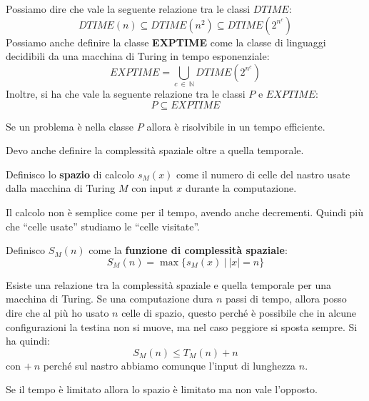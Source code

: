 Possiamo dire che vale la seguente relazione tra le classi $DTIME$:
\begin{equation}
    DTIME(n) \subseteq DTIME(n^2) \subseteq DTIME(2^{n^c})
\end{equation}
Possiamo anche definire la classe \textbf{EXPTIME} come la classe di linguaggi
decidibili da una macchina di Turing in tempo esponenziale:
\begin{equation}
    EXPTIME =  \bigcup_{c \ \in \ \mathbb{N}} DTIME(2^{n^c})
\end{equation}
Inoltre, si ha che vale la seguente relazione tra le classi $P$ e $EXPTIME$:
\begin{equation}
    P \subseteq EXPTIME
\end{equation}
\begin{teorema}
    Se un problema è nella classe $P$ allora è risolvibile in un tempo efficiente.
\end{teorema}
Devo anche definire la complessità spaziale oltre a quella temporale.
\begin{definizione}
    Definisco lo \textbf{spazio} di calcolo $s_M(x)$ come il numero di celle del
    nastro usate dalla macchina di Turing $M$ con input $x$ durante la
    computazione.

    Il calcolo non è semplice come per il tempo, avendo anche decrementi. Quindi
    più che “celle usate” studiamo le “celle visitate”.
\end{definizione}
\begin{definizione}
    Definisco $S_M(n)$ come la \textbf{funzione di complessità spaziale}:
    \begin{equation}
        S_M(n) =  \max\{s_M(x) \ | \ |x| = n\}
    \end{equation}
\end{definizione}
Esiste una relazione tra la complessità spaziale e quella temporale per una
macchina di Turing. Se una computazione dura $n$ passi di tempo, allora posso
dire che al più ho usato $n$ celle di spazio, questo perché è possibile che in
alcune configurazioni la testina non si muove, ma nel caso peggiore si sposta
sempre. Si ha quindi:
\begin{equation}
    S_M(n) \leq T_M(n) + n
\end{equation}
con $+ \ n$ perché sul nastro abbiamo comunque l'input di lunghezza $n$.
\begin{teorema}
    Se il tempo è limitato allora lo spazio è limitato ma non vale l'opposto.
\end{teorema}
